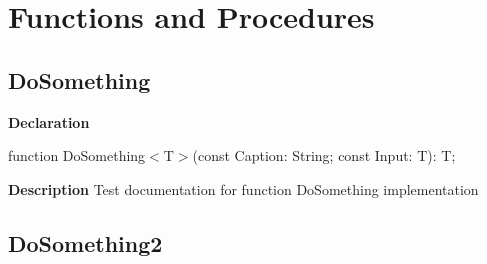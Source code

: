 \documentclass{report}
\newif\ifpdf
\begin{document}
\section{Functions and Procedures}
\ifpdf
\subsection*{\large{\textbf{DoSomething}}\normalsize\hspace{1ex}\hrulefill}
\else
\subsection*{DoSomething}
\fi
\label{ok_generic_routines-DoSomething}
\begin{list}{}{
\setlength{\itemindent}{0cm}
\setlength{\listparindent}{0cm}
\setlength{\leftmargin}{\evensidemargin}
\addtolength{\leftmargin}{\tmplength}
\settowidth{\labelsep}{X}
\addtolength{\leftmargin}{\labelsep}
\setlength{\labelwidth}{\tmplength}
}
\item[\textbf{Declaration}\hfill]
\ifpdf
\begin{flushleft}
\fi
\begin{ttfamily}
function DoSomething{$<$}T{$>$}(const Caption: String; const Input: T): T;\end{ttfamily}

\ifpdf
\end{flushleft}
\fi

\par
\item[\textbf{Description}]
Test documentation for function DoSomething implementation

\end{list}
\ifpdf
\subsection*{\large{\textbf{DoSomething2}}\normalsize\hspace{1ex}\hrulefill}
\else
\end{document}
